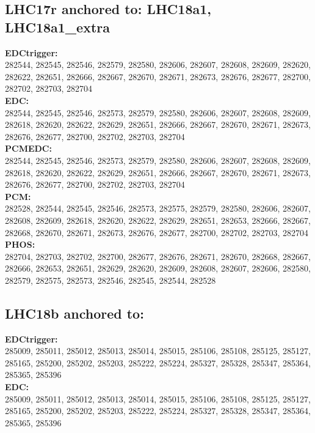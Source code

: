  \subsection{LHC17r anchored to: LHC18a1, LHC18a1\_extra}

 \textbf{EDCtrigger:}\\
282544, 282545, 282546, 282579, 282580, 282606, 282607, 282608, 282609, 282620, 282622, 282651, 282666, 282667, 282670, 282671, 282673, 282676, 282677, 282700, 282702, 282703, 282704\\

 \textbf{EDC:}\\
282544, 282545, 282546, 282573, 282579, 282580, 282606, 282607, 282608, 282609, 282618, 282620, 282622, 282629, 282651, 282666, 282667, 282670, 282671, 282673, 282676, 282677, 282700, 282702, 282703, 282704\\

 \textbf{PCMEDC:}\\
 282544, 282545, 282546, 282573, 282579, 282580, 282606, 282607, 282608, 282609, 282618, 282620, 282622, 282629, 282651, 282666, 282667, 282670, 282671, 282673, 282676, 282677, 282700, 282702, 282703, 282704\\

 \textbf{PCM:}\\
282528, 282544, 282545, 282546, 282573, 282575, 282579, 282580, 282606, 282607, 282608, 282609, 282618, 282620, 282622, 282629, 282651, 282653, 282666, 282667, 282668, 282670, 282671, 282673, 282676, 282677, 282700, 282702, 282703, 282704\\

 \textbf{PHOS:}\\
282704, 282703, 282702, 282700, 282677, 282676, 282671, 282670, 282668, 282667, 282666, 282653, 282651, 282629, 282620, 282609, 282608, 282607, 282606, 282580, 282579, 282575, 282573, 282546, 282545, 282544, 282528\\


 \subsection{LHC18b anchored to:  }

  \textbf{EDCtrigger:}\\
 285009, 285011, 285012, 285013, 285014, 285015, 285106, 285108, 285125, 285127, 285165, 285200, 285202, 285203, 285222, 285224, 285327, 285328, 285347, 285364, 285365, 285396 \\

 \textbf{EDC:}\\
 285009, 285011, 285012, 285013, 285014, 285015, 285106, 285108, 285125, 285127, 285165, 285200, 285202, 285203, 285222, 285224, 285327, 285328, 285347, 285364, 285365, 285396 \\

